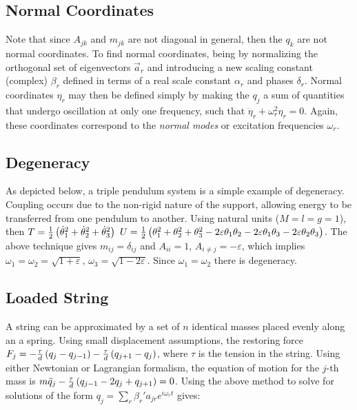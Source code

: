 \subsection{Normal Coordinates}
Note that since $A_{jk}$ and $m_{jk}$ are not diagonal in general, then the $q_k$ are not normal coordinates. To find normal coordinates, being by normalizing the orthogonal set of eigenvectors $\vec{a}_r$ and introducing a new scaling constant (complex) $\beta_r$ defined in terms of a real scale constant $\alpha_r$ and phases $\delta_r$. 
Normal coordinates $\eta_r$ may then be defined simply by making the $q_j$ a sum of quantities that undergo oscillation at only one frequency, such that $\ddot{\eta}_r + \omega_r^2 \eta_r = 0$. Again, these coordinates correspond to the \textit{normal modes} or excitation frequencies $\omega_r$.

\subsection{Degeneracy}
As depicted below, a triple pendulum system is a simple example of degeneracy. Coupling occurs due to the non-rigid nature of the support, allowing energy to be transferred from one pendulum to another. Using natural units ($M=l=g=1$), then $T=\frac{1}{2}\left(\dot{\theta}_1^2 + \dot{\theta}_2^2 + \dot{\theta}_3^2\right)$ $U=\frac{1}{2}\left(\theta_1^2+\theta_2^2+\theta_3^2 -2\varepsilon\theta_1\theta_2 -2\varepsilon\theta_1\theta_3 -2\varepsilon\theta_2\theta_3\right)$. The above technique gives $m_{ij}=\delta_{ij}$ and $A_{ii}=1$, $A_{i\neq j}=-\varepsilon$, which implies $\omega_1=\omega_2=\sqrt{1+\varepsilon}$, $\omega_3=\sqrt{1-2\varepsilon}$. Since $\omega_1=\omega_2$ there is degeneracy.

\subsection{Loaded String}
A string can be approximated by a set of $n$ identical masses placed evenly along an a spring. Using small displacement assumptions, the restoring force $F_j=-\frac{\tau}{d}\left(q_j - q_{j-1}\right)-\frac{\tau}{d}\left(q_{j+1} - q_j\right)$, where $\tau$ is the tension in the string. Using either Newtonian or Lagrangian formalism, the equation of motion for the $j$-th mass is $m\ddot{q}_j-\frac{\tau}{d}\left(q_{j-1}-2q_j+q_{j+1}\right)=0$. Using the above method to solve for solutions of the form $q_j=\sum_r \beta_r' a_{jr} e^{i\omega_r t}$ gives:


